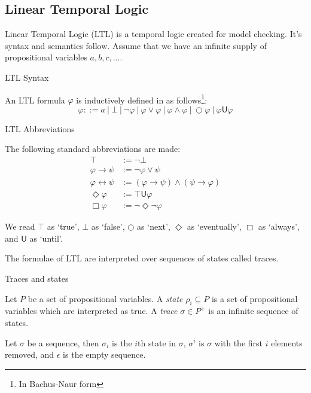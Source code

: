\documentclass[a4paper]{article}
\newcommand{\U}{\mathsf{U}}
\begin{document}
\subsection{Linear Temporal Logic}
Linear Temporal Logic (LTL)\autocite{pnueli1977temporal} is a temporal logic created for model checking. It's syntax and semantics follow. Assume that we have an infinite supply of propositional variables $a,b,c,\dots$.
\begin{defn}{LTL Syntax}

  An LTL formula $\varphi$ is inductively defined in as follows\footnote{In Bachus-Naur form}:
  \[\varphi ::= a ~|~ \bot ~|~ \neg \varphi ~|~\varphi \lor \varphi ~|~ \varphi \land \varphi ~|~ \bigcirc \varphi ~|~ \varphi \U\varphi\]
\end{defn}
\begin{notn}{LTL Abbreviations}

  The following standard abbreviations are made:
  \begin{align*}
    \top &:= \neg \bot\\
    \varphi \to \psi &:= \neg \varphi \lor \psi\\
    \varphi \leftrightarrow \psi &:= (\varphi \to \psi) \land (\psi \to \varphi)\\
    \Diamond \varphi &:= \top \U{} \varphi\\
    \Box \varphi &:= \neg\Diamond\neg\varphi
  \end{align*}
\end{notn}

We read $\top$ as `true', $\bot$ as `false', $\bigcirc$ as `next', $\Diamond$ as `eventually', $\Box$ as `always', and $\U$ as `until'.

The formulae of LTL are interpreted over sequences of states called traces.

\begin{defn}{Traces and states}

  Let $P$ be a set of propositional variables. A \emph{state} $\rho_i \subseteq P$ is a set of propositional variables which are interpreted as true. A \emph{trace} $\sigma \in P^+$ is an infinite sequence of states.
\end{defn}

\begin{notn}
Let $\sigma$ be a sequence, then $\sigma_i$ is the $i$th state in $\sigma$, $\sigma^i$ is $\sigma$ with the first $i$ elements removed, and $\epsilon$ is the empty sequence.
\end{notn}
\end{document}
